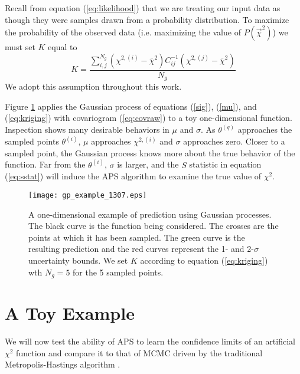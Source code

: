 \documentclass[useAMS,usenatbib]{aastex}
\newcommand{\APS}{APS }
\begin{document}
Recall from equation (\ref{eq:likelihood}) that we are treating our
input data as though they were samples drawn from a probability distribution.
To maximize the probability of the observed data (i.e. maximizing the value
of $P(\vec{\chi}^2)$) we must set $K$ equal to
\begin{equation}
\label{eq:kriging}
K=\frac{\sum_{i,j}^{N_g}(\chi^{2,(i)}-\bar{\chi}^2)
C^{-1}_{ij}(\chi^{2,(j)}-\bar{\chi}^2)}
{N_g}
\end{equation}
We adopt this assumption throughout this work.

Figure \ref{fig:gp} applies the Gaussian process of equations (\ref{sig}), 
(\ref{mu}), and (\ref{eq:kriging}) with covariogram (\ref{eq:covraw})
to a toy one-dimensional function.  Inspection shows many desirable
behaviors in $\mu$ and $\sigma$.  
As $\theta^{(q)}$ approaches the sampled points $\theta^{(i)}$, $\mu$
approaches $\chi^{2,(i)}$ and $\sigma$ approaches zero.  
Closer to a sampled point,
the Gaussian process knows more about the true behavior of the function. 
Far from the $\theta^{(i)}$, $\sigma$ is larger, and the $S$ statistic in
equation (\ref{eq:sstat}) will induce the \APS
algorithm to examine the true value of $\chi^2$.

\begin{figure}
\texttt{[image: gp\_example\_1307.eps]}
\caption{
A one-dimensional example of prediction using Gaussian processes.  
The black curve is the function
being considered.  The crosses are the points at which it has been sampled.  The
green curve is the resulting prediction and the red curves represent the 
1- and
2-$\sigma$ uncertainty bounds.  We set $K$ according to 
equation (\ref{eq:kriging}) wth $N_g=5$ for the 5 sampled points.
}
\label{fig:gp}
\end{figure}

\section{A Toy Example}
\label{sec:toy}

We will now test the ability of APS to learn the confidence limits of an
artificial $\chi^2$ function and compare it to that of MCMC driven by the
traditional Metropolis-Hastings algorithm \cite{mcmc,cosmomc}.
\end{document}
